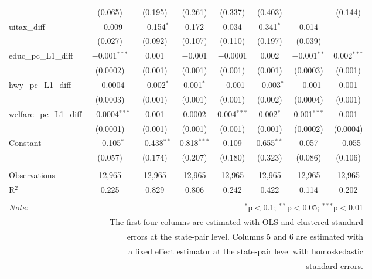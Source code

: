 \begin{table}[!htbp]
\begin{tabular}{@{\extracolsep{5pt}}lccccccc}
  & (0.065) & (0.195) & (0.261) & (0.337) & (0.403) &  & (0.144) \\ 
  uitax\_diff & $-$0.009 & $-$0.154$^{*}$ & 0.172 & 0.034 & 0.341$^{*}$ & 0.014 &  \\ 
  & (0.027) & (0.092) & (0.107) & (0.110) & (0.197) & (0.039) &  \\ 
  educ\_pc\_L1\_diff & $-$0.001$^{***}$ & 0.001 & $-$0.001 & $-$0.0001 & 0.002 & $-$0.001$^{**}$ & 0.002$^{***}$ \\ 
  & (0.0002) & (0.001) & (0.001) & (0.001) & (0.001) & (0.0003) & (0.001) \\ 
  hwy\_pc\_L1\_diff & $-$0.0004 & $-$0.002$^{*}$ & 0.001$^{*}$ & $-$0.001 & $-$0.003$^{*}$ & $-$0.001 & 0.001 \\ 
  & (0.0003) & (0.001) & (0.001) & (0.001) & (0.002) & (0.0004) & (0.001) \\ 
  welfare\_pc\_L1\_diff & $-$0.0004$^{***}$ & 0.001 & 0.0002 & 0.004$^{***}$ & 0.002$^{*}$ & 0.001$^{***}$ & 0.001 \\ 
  & (0.0001) & (0.001) & (0.001) & (0.001) & (0.001) & (0.0002) & (0.0004) \\ 
  Constant & $-$0.105$^{*}$ & $-$0.438$^{**}$ & 0.818$^{***}$ & 0.109 & 0.655$^{**}$ & 0.057 & $-$0.055 \\ 
  & (0.057) & (0.174) & (0.207) & (0.180) & (0.323) & (0.086) & (0.106) \\ 
 \hline \\[-1.8ex] 
Observations & 12,965 & 12,965 & 12,965 & 12,965 & 12,965 & 12,965 & 12,965 \\ 
R$^{2}$ & 0.225 & 0.829 & 0.806 & 0.242 & 0.422 & 0.114 & 0.202 \\ 
\hline 
\hline \\[-1.8ex] 
\textit{Note:}  & \multicolumn{7}{r}{$^{*}$p$<$0.1; $^{**}$p$<$0.05; $^{***}$p$<$0.01} \\ 
 & \multicolumn{7}{r}{The first four columns are estimated with OLS and clustered standard} \\ 
 & \multicolumn{7}{r}{ errors at the state-pair level. Columns 5 and 6 are estimated with} \\ 
 & \multicolumn{7}{r}{a fixed effect estimator at the state-pair level with homoskedastic} \\ 
 & \multicolumn{7}{r}{standard errors.} \\ 
\end{tabular} 
\end{table} 
